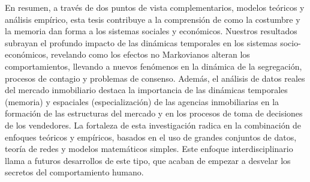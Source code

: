 \thispagestyle{empty}

En resumen, a través de dos puntos de vista complementarios, modelos teóricos y análisis empírico, esta tesis contribuye a la comprensión de como la costumbre y la memoria dan forma a los sistemas sociales y económicos. Nuestros resultados subrayan el profundo impacto de las dinámicas temporales en los sistemas socio-económicos, revelando como los efectos no Markovianos alteran los comportamientos, llevando a nuevos fenómenos en la dinámica de la segregación, procesos de contagio y problemas de consenso. Además, el análisis de datos reales del mercado inmobiliario destaca la importancia de las dinámicas temporales (memoria) y espaciales (especialización) de las agencias inmobiliarias en la formación de las estructuras del mercado y en los procesos de toma de decisiones de los vendedores. La fortaleza de esta investigación radica en la combinación de enfoques teóricos y empíricos, basados en el uso de grandes conjuntos de datos, teoría de redes y modelos matemáticos simples. Este enfoque interdisciplinario llama a futuros desarrollos de este tipo, que acaban de empezar a desvelar los secretos del comportamiento humano.

\vfill